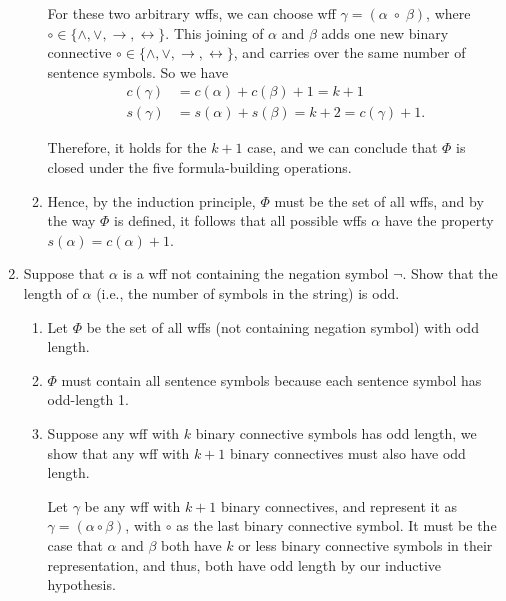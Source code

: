 \documentclass[11pt]{article}
\newcommand{\n}{\vspace{0.5cm}}
\begin{document}
\begin{enumerate}
\begin{enumerate}[label=(\alph*)]
          For these two arbitrary wffs, we can choose wff \(\gamma = (\alpha \;\circ\; \beta)\), where \(\circ \in \{\wedge, \vee, \to, \leftrightarrow\}\). This joining of \(\alpha\) and \(\beta\) adds one new binary connective \(\circ \in \{\wedge, \vee, \to,\leftrightarrow\}\), and carries over the same number of sentence symbols.  So we have 
          \begin{align*}
            c(\gamma) &= c(\alpha) + c(\beta) + 1 = k+1 \\
            s(\gamma) &= s(\alpha) + s(\beta) = k + 2 = c(\gamma) + 1.
          \end{align*}

          Therefore, it holds for the \(k+1\) case, and we can conclude that \(\varPhi\) is closed under the five formula-building operations. \n

        \item Hence, by the induction principle, \(\varPhi\) must be the set of all wffs, and by the way \(\varPhi\) is defined, it follows that all possible wffs \(\alpha\) have the property \(s(\alpha) = c(\alpha) + 1\). 
      \end{enumerate}


    \newpage
    \item Suppose that \(\alpha\) is a wff not containing the negation symbol \(\neg\).  Show that the length of \(\alpha\) (i.e., the number of symbols in the string) is odd.

      \begin{enumerate}
        \item Let \(\varPhi\) be the set of all wffs (not containing negation symbol) with odd length. \n

        \item \(\varPhi\) must contain all sentence symbols because each sentence symbol has odd-length 1. \n

        \item Suppose any wff with \(k\) binary connective symbols has odd length, we show that any wff with \(k+1\) binary connectives must also have odd length. \n

          Let \(\gamma\) be any wff with \(k+1\) binary connectives, and represent it as \(\gamma = (\alpha \circ \beta)\), with \(\circ\) as the last binary connective symbol.  It must be the case that \(\alpha\) and \(\beta\) both have \(k\) or less binary connective symbols in their representation, and thus, both have odd length by our inductive hypothesis. \n


\end{enumerate}
\end{enumerate}
\end{document}
